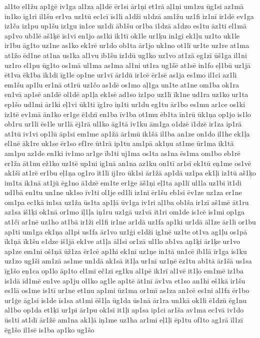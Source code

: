 {al1to
el1žu
ap1ģē
iv1ga
al1za
aļ1dē
ēr1si
ār1ņi
et1rā
aļ1ņi
um1zu
ūg1si
az1mā
in1ko
īg1ri
il1šu
er1va
uz1tū
ec1cī
īs1li
a1dži
u1dzā
am1žu
uz1fi
iz1nī
ir1dē
ev1ga
iz1ča
iz1pu
up1šu
iz1gu
in1ce
uz1dī
āb1šu
or1ba
i1dzā
a1dzo
es1tu
āz1ti
el1mā
ap1vo
ub1lē
aš1ķē
īs1vi
en1jo
as1ki
ik1tī
ok1le
ur1ķu
in1gī
ek1ļu
uz1to
uk1le
ir1bu
āg1to
uz1ne
as1ko
ek1rē
ur1do
ob1ta
ār1jo
uk1no
ot1lī
ur1te
uz1re
at1ma
at1žo
ēd1ne
at1na
us1ka
al1vu
ib1šu
iz1dū
ug1ko
uz1vo
at1zā
eg1zī
ūš1ga
il1ni
uz1ro
el1pu
ūg1to
os1mā
ul1ma
as1ma
al1ni
ut1ra
ug1šē
at1sē
in1fo
eļ1bū
uz1jā
ēt1va
ēk1ba
ik1di
īg1le
op1ne
ur1vī
ār1dū
ir1cē
ēr1sē
as1ja
es1mo
il1ci
az1li
em1šu
ap1lu
er1nā
ot1rū
uz1čo
as1dē
os1mo
aļ1ga
un1te
at1ne
om1ba
ok1ra
en1vā
ap1sē
an1dē
ol1dē
ap1ļa
ek1sē
ad1so
iz1po
uz1lī
īk1ne
ud1ra
uz1ko
ur1ta
ep1šo
ud1mi
ār1ki
eļ1vi
ūk1ti
īg1ro
iņ1ti
ur1du
eg1tu
ār1bo
es1mu
ar1ce
os1ki
iz1tē
ev1mā
ān1ko
er1ge
ē1dzī
en1ba
īv1ba
ot1mu
ēb1ta
īn1rū
ūk1ņa
op1jo
is1lo
ob1ru
ur1li
ēs1le
ur1lā
ēj1rā
ul1ko
āg1tā
iv1ku
ām1ga
o1dzē
ī1dzē
ir1za
ip1rā
at1tū
iv1vi
op1lū
āp1si
em1me
ap1žā
ār1mū
ik1šā
il1ba
an1ze
on1do
il1he
ek1ļa
el1nē
āk1re
uk1se
ēr1so
ef1re
ūt1rā
ip1tu
am1pā
ak1ņu
at1me
ūr1ma
ik1tā
am1pu
az1de
en1ki
iv1mo
ar1ge
īb1ti
uj1ma
os1ta
as1na
ēs1ma
om1bo
eb1rē
er1ža
āt1nu
ež1ko
uz1tē
up1ni
ig1nā
an1na
az1ku
on1tī
ar1sī
ek1tū
eņ1me
os1vē
ak1šī
at1rē
er1bu
eļ1ņa
og1ro
īt1lī
ij1ro
ūk1si
ār1žā
ap1dā
uz1pa
ek1ļi
iz1tū
aš1ķo
im1ta
ik1nā
at1jū
ēg1no
ā1dzē
em1te
er1ģe
āš1ņi
eļ1ta
ap1lī
ul1la
uz1bi
īt1di
ud1bā
en1tu
un1ne
uk1so
īv1ti
ol1je
ed1li
iz1ni
ēr1šu
eb1si
ēv1ze
uz1za
er1ne
om1pa
ec1kā
in1sa
uz1ža
ūs1ta
ap1ļā
ūv1ga
iv1ri
aļ1ba
ob1ša
ir1zī
aš1mē
āt1ru
az1sa
iš1ķi
ok1nā
or1mo
iļ1ļa
iņ1ru
uz1gā
uz1vā
it1ri
om1de
is1cē
is1mi
op1ga
at1čī
ar1nē
uz1ho
at1bā
ir1ži
el1fi
ir1ne
ar1dā
uz1fa
ap1ki
ur1dā
āl1ze
ār1li
or1bu
ap1ti
um1ga
ek1ņa
al1pi
us1fa
ār1vo
uz1ģi
e1dži
ig1nē
uz1te
ot1va
ag1ļu
os1pā
īk1ņā
īk1šu
e1dze
iš1jā
ek1ve
at1ļa
āl1si
or1zā
ul1lo
ab1va
aņ1ķi
ār1ķe
ur1vo
ap1ze
em1ni
oš1ņā
ūž1za
ēr1cē
ap1hi
ek1nī
uz1ņe
in1tā
un1cē
ib1lā
īr1ga
is1ku
uz1zo
ug1ši
am1zā
as1me
un1dā
ak1sā
it1ļa
ur1nī
uz1ņē
ēz1tu
ab1tā
ār1šā
us1sa
īg1šo
eņ1ca
op1lo
āp1to
el1mī
eč1zi
eg1ku
al1pē
ik1rī
al1vē
it1ļo
em1mē
iz1ba
is1dā
īd1mē
en1ve
ap1ju
ol1ko
ag1le
ap1tē
āt1nī
āv1va
et1so
an1hi
eš1kā
ir1šu
es1lā
os1me
is1tī
ur1ne
et1nu
ap1mi
ūz1ma
or1mī
as1za
an1cē
es1ni
al1fa
ēr1bo
ur1ģe
āg1si
is1de
īs1sa
at1mi
ēš1ļa
ūg1da
ūs1nā
ār1ra
un1kā
ok1li
ē1dzū
ēg1nu
al1bo
op1da
et1ķī
ur1pi
ār1pu
ok1sī
it1ļi
ap1sa
ip1ci
ar1ša
av1ma
ec1vā
iv1do
ūs1ti
at1dī
ār1žē
am1na
ak1ļā
iņ1me
uz1ha
ar1mi
eļ1ļi
ēp1tu
of1to
ag1rā
il1zī
ēg1šo
il1sē
is1ba
ap1ko
ug1šo
}
